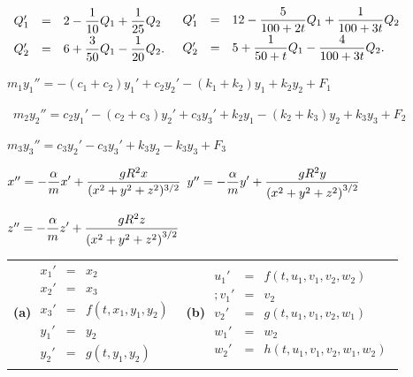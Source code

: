 \medskip

$\begin{array}{rcl}
Q_{1}'&=&\displaystyle{2-\frac{1}{10}Q_{1}+\frac{1}{25}Q_{2}}\\[2\jot]
Q_{2}'&=&\displaystyle{6+\frac{3}{50}Q_{1}-\frac{1}{20}Q_{2}}.
\end{array}$
$\begin{array}{rcl}
Q_{1}'&=&\displaystyle{12-\frac{5}{100+2t}Q_{1}+\frac{1}{100+3t}Q_{2}}\\[2\jot]
Q_{2}'&=&\displaystyle{5+\frac{1}{50+t}Q_{1}-\frac{4}{100+3t}Q_{2}}.
\end{array}$

 $m_{1}y_{1}''=-(c_{1}+c_{2})y_{1}'+c_{2}y_{2}'-(k_{1}+k_{2})y_{1}+k_{2}y_{2}+F_{1}$

\smallskip

\quad\,
$m_{2}y_{2}''=c_{2}y_{1}'-(c_{2}+c_{3})y_{2}'+c_{3}y_{3}'+k_{2}y_{1}
-(k_{2}+k_{3})y_{2}+k_{3}y_{3}+F_{2}$

\smallskip

\quad\;
$m_{3}y_{3}''=c_{3}y_{2}'-c_{3}y_{3}'+k_{3}y_{2}-k_{3}y_{3}+F_{3}$

$x''=-\displaystyle{\frac{\alpha}{m}x'+\frac{gR^{2}x}{(x^{2}+y^{2}+z^{2})^{3/2}}}$\;
 $y''=-\displaystyle{\frac{\alpha}{m}y'+\frac{gR^{2}y}{\left(x^{2}+y^{2}+z^{2}\right)^{3/2}}}$

\smallskip
\quad\;
$z''=-\displaystyle{\frac{\alpha}{m}z'+\frac{gR^{2}z}{\left(x^{2}+y^{2}+z^{2}\right)^{3/2}}}$

\begin{tabular}[t]{@{}p{168pt}@{}p{168pt}}
{\bf (a)} $\begin{array}{ccl}
x_{1}'&=&x_{2}\\x_{2}'&=&x_{3}\\x_{3}'&=&f(t,x_{1},y_{1},y_{2})\\y_{1}'&=
&y_{2}\\y_{2}'&=&g(t,y_{1},y_{2})
\end{array}$&
{\bf (b)} $\begin{array}{ccl}
u_{1}'&=&f(t,u_{1},v_{1},v_{2},w_{2})\\;
v_{1}'&=&v_{2}\\
v_{2}'&=&g(t,u_{1},v_{1},v_{2},w_{1})\\
w_{1}'&=&w_{2}\\
w_{2}'&=&h(t,u_{1},v_{1},v_{2},w_{1},w_{2})
\end{array}$
\end{tabular}

